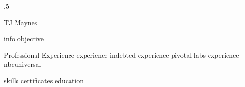 \documentclass[10pt]{article}
\begin{document}
\moveleft.5\hoffset\centerline{\huge TJ Maynes}
{info}
{objective}
\begin{section}{Professional Experience}
  {experience-indebted}
  {experience-pivotal-labs}
  {experience-nbcuniversal}
\end{section}
{skills}
{certificates}
{education}
\end{document}
